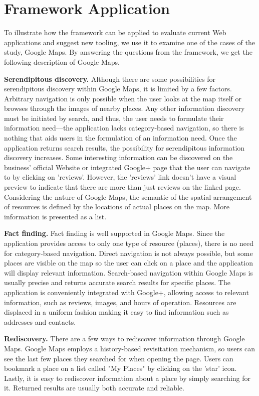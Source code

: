 \documentclass{casconpaper}
\begin{document}
{{\section{Framework Application}
To illustrate how the framework can be applied to evaluate current Web applications and suggest new tooling, we use it to examine one of the cases of the study, Google Maps. By answering the questions from the framework, we get the following description of Google Maps.

\textbf{Serendipitous discovery.} Although there are some possibilities for serendipitous discovery within Google Maps, it is limited by a few factors. Arbitrary navigation is only possible when the user looks at the map itself or browses through the images of nearby places. Any other information discovery must be initiated by search, and thus, the user needs to formulate their information need---the application lacks category-based navigation, so there is nothing that aids users in the formulation of an information need. Once the application returns search results, the possibility for serendipitous information discovery increases. Some interesting information can be discovered on the business' official Website or integrated Google+ page that the user can navigate to by clicking on 'reviews'. However, the 'reviews' link doesn't have a visual preview to indicate that there are more than just reviews on the linked page. Considering the nature of Google Maps, the semantic of the spatial arrangement of resources is defined by the locations of actual places on the map. More information is presented as a list. 

\textbf{Fact finding.} Fact finding is well supported in Google Maps. Since the application provides access to only one type of resource (places), there is no need for category-based navigation. Direct navigation is not always possible, but some places are visible on the map so the user can click on a place and the application will display relevant information. Search-based navigation within Google Maps is usually precise and returns accurate search results for specific places. The application is conveniently integrated with Google+, allowing access to relevant information, such as reviews, images, and hours of operation. Resources are displaced in a uniform fashion making it easy to find information such as addresses and contacts. 

\textbf{Rediscovery.} There are a few ways to rediscover information through Google Maps. Google Maps employs a history-based revisitation mechanism, so users can see the last few places they searched for when opening the page. Users can bookmark a place on a list called "My Places" by clicking on the 'star' icon. Lastly, it is easy to rediscover information about a place by simply searching for it. Returned results are usually both accurate and reliable.

}}
\end{document}
